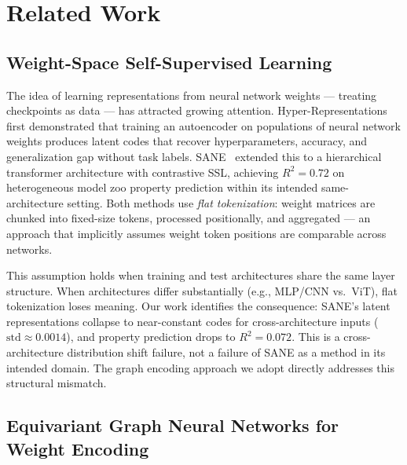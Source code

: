 \section{Related Work}
\label{sec:related}

\subsection*{Weight-Space Self-Supervised Learning}

The idea of learning representations from neural network weights ---
treating checkpoints as data --- has attracted growing attention.
Hyper-Representations~\cite{Schurholt2021Hyper} first demonstrated that training an autoencoder
on populations of neural network weights produces latent codes that recover hyperparameters,
accuracy, and generalization gap without task labels.
SANE~\cite{Schurholt2024Towards} extended this to a hierarchical transformer architecture
with contrastive SSL, achieving $R^2 = 0.72$ on heterogeneous model zoo property prediction
within its intended same-architecture setting.
Both methods use \emph{flat tokenization}: weight matrices are chunked into fixed-size tokens,
processed positionally, and aggregated ---
an approach that implicitly assumes weight token positions are comparable across networks.

This assumption holds when training and test architectures share the same layer structure.
When architectures differ substantially (e.g., MLP/CNN vs.\ ViT), flat tokenization loses meaning.
Our work identifies the consequence:
SANE's latent representations collapse to near-constant codes for cross-architecture inputs
($\text{std} \approx 0.0014$), and property prediction drops to $R^2 = 0.072$.
This is a cross-architecture distribution shift failure, not a failure of SANE as a method
in its intended domain.
The graph encoding approach we adopt directly addresses this structural mismatch.

\subsection*{Equivariant Graph Neural Networks for Weight Encoding}

